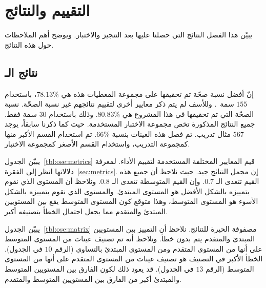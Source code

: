 

\chapter{التقييم والنتائج}
يبيّن هذا الفصل النتائج التي حصلنا عليها بعد التنجيز والاختبار.
ويوضح أهم الملاحظات حول هذه النتائج.

\section{نتائج الـ }
إنّ أفضل نسبة صحّة تم تحقيقها على مجموعة المعطيات هذه هي $78.13\%$،
باستخدام $155$ سمة~\cite{vajjala2018}.
وللأسف لم يتم ذكر معايير أخرى لتقييم نتائجهم غير نسبة الصحّة.
نسبة الصحّة التي تم تحقيقها في هذا المشروع هي $80.83\%$.
وذلك باستخدام $30$ سمة فقط.
جميع النتائج المذكورة تخص مجموعة الاختبار المستخدمة.
حيث كما ذكرنا سابقاً، يوجد $567$ مثال تدريب.
تم فصل هذه العينات بنسبة $66\%$.
تم استخدام القسم الأكبر منها كمجموعة التدريب،
واستخدام القسم الأصغر كمجموعة الاختبار.

يبيّن الجدول~\ref{tbl:ose:metrics} قيم المعايير المختلفة المستخدمة لتقييم الأداء.
لمعرفة دلالاتها انظر إلى الفقرة~\ref{sec:metrics}.
إن مجمل النتائج جيد.
حيث نلاحظ أن جميع هذه القيم تتعدى الـ $0.7$.
وإن القيم المتوسطة تتعدى الـ $0.8$.
ونلاحظ أن المستوى الذي نقوم بتمييزه بالشكل الأفضل هو المستوى المبتدئ.
والمستوى الذي نقوم بتمييزه بالشكل الأسوء هو المستوى المتوسط،
وهذا متوقع كون المستوى المتوسط يقع بين المستويين المبتدئ والمتقدم مما يجعل احتمال الخطأ بتصنيفه أكبر.

يبيّن الجدول~\ref{tbl:ose:matrix} مصفوفة الحيرة للنتائج.
نلاحظ أن التمييز بين المستويين المبتدئ والمتقدم يتم بدون خطأ.
ونلاحظ أنه تم تصنيف عينات من المستوى المتوسط على أنها من المستوى المتقدم ومن المستوى المبتدئ بالتساوي (الرقم $10$ في الجدول).
الخطأ الأكبر في التصنيف هو تصنيف عينات من المستوى المتقدم على أنها من المستوى المتوسط (الرقم $13$ في الجدول).
قد يعود ذلك لكون الفارق بين المستويين المتوسط والمبتدئ أكبر من الفارق بين المستويين المتوسط والمتقدم.

